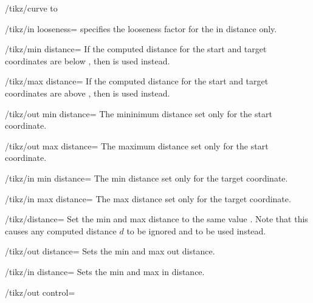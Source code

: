 \begin{key}{/tikz/curve to}
  \begin{key}{/tikz/in looseness=}
    specifies the looseness factor for the in distance only.
  \end{key}
  \begin{key}{/tikz/min distance=}
    If the computed distance for the start and target coordinates are
    below , then  is used instead.
  \end{key}
  \begin{key}{/tikz/max distance=}
    If the computed distance for the start and target coordinates are
    above , then  is used instead.
  \end{key}
  \begin{key}{/tikz/out min distance=}
    The mininimum distance set only for the start coordinate.
  \end{key}
  \begin{key}{/tikz/out max distance=}
    The maximum distance set only for the start coordinate.
  \end{key}
  \begin{key}{/tikz/in min distance=}
    The min distance set only for the target coordinate.
  \end{key}
  \begin{key}{/tikz/in max distance=}
    The max distance set only for the target coordinate.
  \end{key}
  \begin{key}{/tikz/distance=}
    Set the min and max distance to the same value . Note
    that this causes any computed distance $d$ to be ignored and
     to be used instead.
\begin{codeexample}[]
\end{codeexample}
  \end{key}
  \begin{key}{/tikz/out distance=}
    Sets the min and max out distance.
  \end{key}
  \begin{key}{/tikz/in distance=}
    Sets the min and max in distance.
  \end{key}
  \begin{key}{/tikz/out control=}

\end{key}
\end{key}
